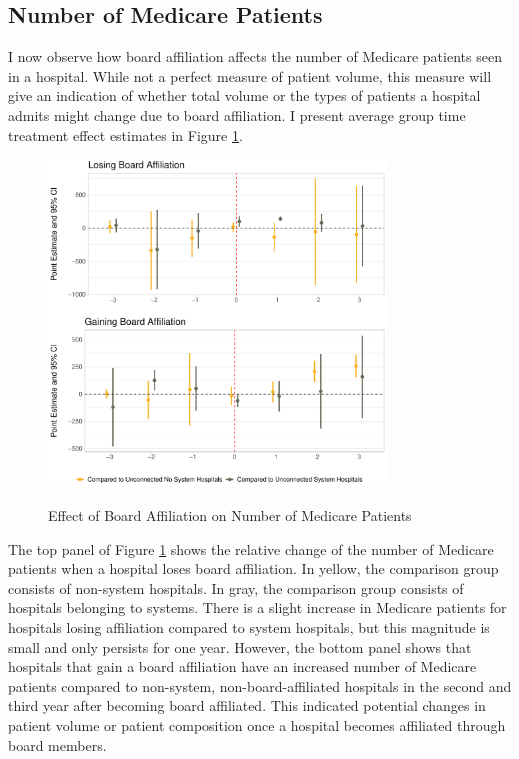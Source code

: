 \documentclass[12pt]{article}
\begin{document}
    \subsection{Number of Medicare Patients}

    I now observe how board affiliation affects the number of Medicare patients seen in a hospital. While not a perfect measure of patient volume, this measure will give an indication of whether total volume or the types of patients a hospital admits might change due to board affiliation. I present average group time treatment effect estimates in Figure \ref{fig:benes_did}. 

    \begin{figure}[ht!]
        \centering
        \caption{Effect of Board Affiliation on Number of Medicare Patients}
        \includegraphics[width=0.8\textwidth]{Objects/benes_did.pdf}
        \label{fig:benes_did}
    \end{figure}

    The top panel of Figure \ref{fig:benes_did} shows the relative change of the number of Medicare patients when a hospital loses board affiliation. In yellow, the comparison group consists of non-system hospitals. In gray, the comparison group consists of hospitals belonging to systems. There is a slight increase in Medicare patients for hospitals losing affiliation compared to system hospitals, but this magnitude is small and only persists for one year. However, the bottom panel shows that hospitals that gain a board affiliation have an increased number of Medicare patients compared to non-system, non-board-affiliated hospitals in the second and third year after becoming board affiliated. This indicated potential changes in patient volume or patient composition once a hospital becomes affiliated through board members. 
\end{document}
